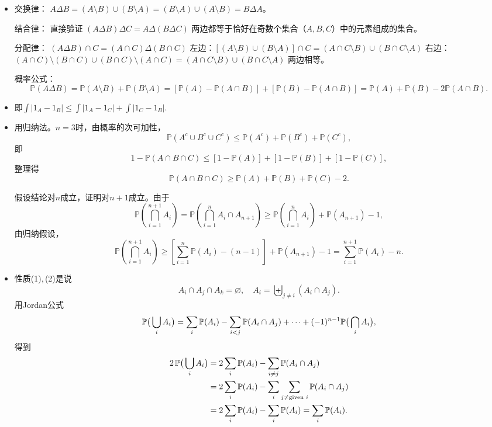 \begin{itemize}
    \item[2.22]
    交换律： $A\Delta B = (A\setminus B)\cup(B\setminus A) = (B\setminus A)\cup(A\setminus B) = B\Delta A$。

    结合律： 直接验证 $(A\Delta B)\Delta C = A\Delta(B\Delta C)$
    两边都等于恰好在奇数个集合（$A,B,C$）中的元素组成的集合。

    分配律： $(A\Delta B)\cap C = (A\cap C)\Delta(B\cap C)$
    左边：$[(A\setminus B)\cup(B\setminus A)]\cap C = (A\cap C\setminus B)\cup(B\cap C\setminus A)$
    右边：$(A\cap C)\setminus(B\cap C)\cup(B\cap C)\setminus(A\cap C) = (A\cap C\setminus B)\cup(B\cap C\setminus A)$
    两边相等。

    概率公式：
    $$\mathbb{P}(A\Delta B) = \mathbb{P}(A\setminus B) + \mathbb{P}(B\setminus A) 
    = [\mathbb{P}(A) - \mathbb{P}(A\cap B)] + [\mathbb{P}(B) - \mathbb{P}(A\cap B)] 
    = \mathbb{P}(A) + \mathbb{P}(B) - 2\mathbb{P}(A\cap B).$$

    \item[2.23]
    即$\int|1_A-1_B|\le\int|1_A-1_C|+\int|1_C-1_B|$.
    \item[2.25]
    用归纳法。$n=3$时，由概率的次可加性，
    \[\mathbb{P}(A^c \cup B^c \cup C^c) \leq \mathbb{P}(A^c) + \mathbb{P}(B^c) + \mathbb{P}(C^c),\]
    即
    \[1 - \mathbb{P}(A\cap B\cap C) \leq [1-\mathbb{P}(A)] + [1-\mathbb{P}(B)] + [1-\mathbb{P}(C)],\]
    整理得
    \[\mathbb{P}(A\cap B\cap C) \geq \mathbb{P}(A) + \mathbb{P}(B) + \mathbb{P}(C) - 2.\]
    
    假设结论对$n$成立，证明对$n+1$成立。由于
    $$\mathbb{P}\left(\bigcap_{i=1}^{n+1} A_i\right) = \mathbb{P}\left(\bigcap_{i=1}^n A_i \cap A_{n+1}\right) \geq \mathbb{P}\left(\bigcap_{i=1}^n A_i\right) + \mathbb{P}(A_{n+1}) - 1,$$
    由归纳假设，
    \[\mathbb{P}\left(\bigcap_{i=1}^{n+1} A_i\right) \geq \left[\sum_{i=1}^n \mathbb{P}(A_i) - (n-1)\right] + \mathbb{P}(A_{n+1}) - 1 = \sum_{i=1}^{n+1} \mathbb{P}(A_i) - n.\]

    \item[2.28]
    性质(1),\,(2)是说$$A_i\cap A_j\cap A_k=\varnothing,
    \quad A_i=\biguplus_{j\ne i}(A_i\cap A_j).$$
    用Jordan公式
    $$\mathbb{P}\big(\bigcup_i A_i\big)=\sum_i\mathbb{P}(A_i)-\sum_{i<j}\mathbb{P}(A_i\cap A_j)
    +\cdots+(-1)^{n-1}\mathbb{P}\big(\bigcap_i A_i\big),$$
    得到\begin{align*}
        2\,\mathbb{P}\big(\bigcup_i A_i\big)&=2\sum_i\mathbb{P}(A_i)-\sum_{i\ne j}\mathbb{P}(A_i\cap A_j)\\
        &=2\sum_i\mathbb{P}(A_i)-\sum_i\sum_{j\ne\text{given }i}\mathbb{P}(A_i\cap A_j)\\
        &=2\sum_i\mathbb{P}(A_i)-\sum_i\mathbb{P}(A_i)=\sum_i\mathbb{P}(A_i).
    \end{align*}


\end{itemize}
